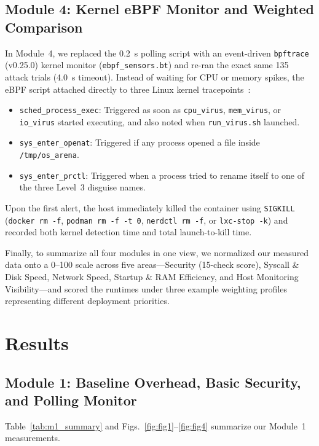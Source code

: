 \documentclass[conference]{IEEEtran}
\begin{document}
\subsection{Module 4: Kernel eBPF Monitor and Weighted Comparison}
In Module~4, we replaced the 0.2~s polling script with an event-driven \texttt{bpftrace} (v0.25.0) kernel monitor (\texttt{ebpf\_sensors.bt}) and re-ran the exact same 135 attack trials (4.0~s timeout). Instead of waiting for CPU or memory spikes, the eBPF script attached directly to three Linux kernel tracepoints~\cite{gregg2019}:
\begin{itemize}
    \item \texttt{sched\_process\_exec}: Triggered as soon as \texttt{cpu\_virus}, \texttt{mem\_virus}, or \texttt{io\_virus} started executing, and also noted when \texttt{run\_virus.sh} launched.
    \item \texttt{sys\_enter\_openat}: Triggered if any process opened a file inside \texttt{/tmp/os\_arena}.
    \item \texttt{sys\_enter\_prctl}: Triggered when a process tried to rename itself to one of the three Level~3 disguise names.
\end{itemize}
Upon the first alert, the host immediately killed the container using \texttt{SIGKILL} (\texttt{docker rm -f}, \texttt{podman rm -f -t 0}, \texttt{nerdctl rm -f}, or \texttt{lxc-stop -k}) and recorded both kernel detection time and total launch-to-kill time.

Finally, to summarize all four modules in one view, we normalized our measured data onto a 0--100 scale across five areas---Security (15-check score), Syscall \& Disk Speed, Network Speed, Startup \& RAM Efficiency, and Host Monitoring Visibility---and scored the runtimes under three example weighting profiles representing different deployment priorities.

\section{Results}

\subsection{Module 1: Baseline Overhead, Basic Security, and Polling Monitor}
Table~\ref{tab:m1_summary} and Figs.~\ref{fig:fig1}--\ref{fig:fig4} summarize our Module~1 measurements.
\end{document}
